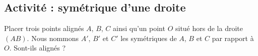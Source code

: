 
\subsection*{Activité : symétrique d'une droite}

Placer trois points alignés \( A\), \( B\), \( C\) ainsi qu'un point \( O\) situé hors de la droite \( (AB)\). Nous nommons \( A'\), \( B'\) et \( C'\) les symétriques de \( A\), \( B\) et \( C\) par rapport à \( O\). Sont-ils alignés ?
